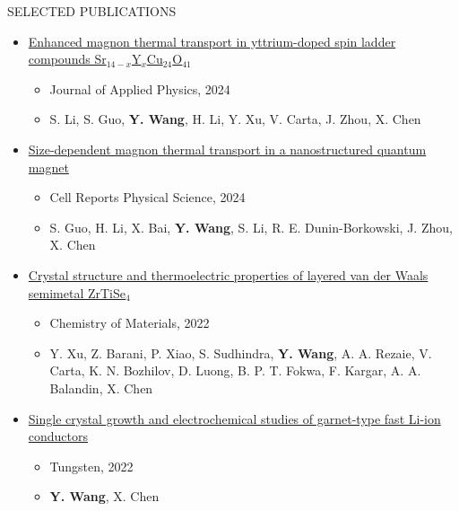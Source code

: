 \documentclass{resume} %
\begin{document}
\begin{rSection}{SELECTED PUBLICATIONS}
\begin{itemize}
\item \href{https://doi.org/10.1063/5.0214897}{Enhanced magnon thermal transport in yttrium-doped spin ladder compounds Sr$_{14-x}$Y$_x$Cu$_{24}$O$_{41}$}
    \begin{itemize}
        \item Journal of Applied Physics, 2024
        \item S. Li, S. Guo, \textbf{Y. Wang}, H. Li, Y. Xu, V. Carta, J. Zhou, X. Chen
    \end{itemize}

\item \href{https://doi.org/10.1016/j.xcrp.2024.101879}{Size-dependent magnon thermal transport in a nanostructured quantum magnet}
    \begin{itemize}
        \item Cell Reports Physical Science, 2024
        \item S. Guo, H. Li, X. Bai, \textbf{Y. Wang}, S. Li, R. E. Dunin-Borkowski, J. Zhou, X. Chen
    \end{itemize}

\item \href{https://doi.org/10.1021/acs.chemmater.2c02155}{Crystal structure and thermoelectric properties of layered van der Waals semimetal ZrTiSe$_4$}
    \begin{itemize}
        \item Chemistry of Materials, 2022
        \item Y. Xu, Z. Barani, P. Xiao, S. Sudhindra, \textbf{Y. Wang}, A. A. Rezaie, V. Carta, K. N. Bozhilov, D. Luong, B. P. T. Fokwa, F. Kargar, A. A. Balandin, X. Chen
    \end{itemize}

\item \href{https://doi.org/10.1007/s42864-022-00176-z}{Single crystal growth and electrochemical studies of garnet-type fast Li-ion conductors}
    \begin{itemize}
        \item Tungsten, 2022
        \item \textbf{Y. Wang}, X. Chen
    \end{itemize}
\end{itemize}

\end{rSection}


\end{document}
